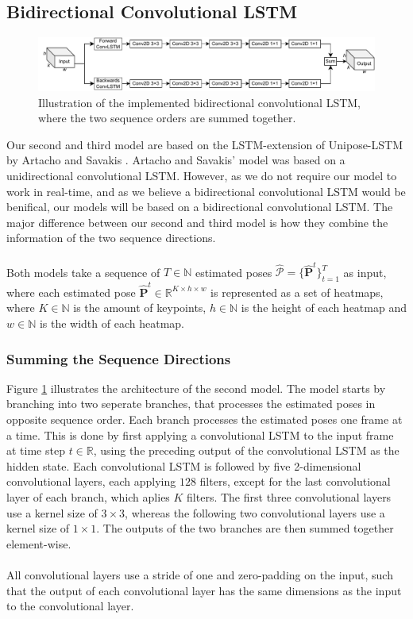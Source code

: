 \documentclass[./main.tex]{subfiles}
\begin{document}
\subsection{Bidirectional Convolutional LSTM}
\begin{figure}[htbp]
    \centering
    \includegraphics[width=\textwidth]{./entities/bi_conv_lstm.pdf}
    \caption{Illustration of the implemented bidirectional convolutional LSTM, where the two sequence orders are summed together.}
    \label{fig:bi_conv_lstm}
\end{figure}

\noindent Our second and third model are based on the LSTM-extension of Unipose-LSTM by Artacho and Savakis \cite{https://doi.org/10.48550/arxiv.2001.08095}. Artacho and Savakis' model was based on a unidirectional convolutional LSTM. However, as we do not require our model to work in real-time, and as we believe a bidirectional convolutional LSTM would be benifical, our models will be based on a bidirectional convolutional LSTM. The major difference between our second and third model is how they combine the information of the two sequence directions.
\\
\\
Both models take a sequence of $T \in \mathbb{N}$ estimated poses $\hat{\mathcal{P}} = \{\hat{\bm{P}}^t\}_{t = 1} ^T$ as input, where each estimated pose $\hat{\bm{P}}^t \in \mathbb{R}^{K \times h \times w}$ is represented as a set of heatmaps, where $K \in \mathbb{N}$ is the amount of keypoints, $h \in \mathbb{N}$ is the height of each heatmap and $w \in \mathbb{N}$ is the width of each heatmap. 

\subsubsection{Summing the Sequence Directions}
Figure \ref{fig:bi_conv_lstm} illustrates the architecture of the second model. The model starts by branching into two seperate branches, that processes the estimated poses in opposite sequence order. Each branch processes the estimated poses one frame at a time. This is done by first applying a convolutional LSTM to the input frame at time step $t \in \mathbb{R}$, using the preceding output of the convolutional LSTM as the hidden state. Each convolutional LSTM is followed by five 2-dimensional convolutional layers, each applying $128$ filters, except for the last convolutional layer of each branch, which aplies $K$ filters. The first three convolutional layers use a kernel size of $3 \times 3$, whereas the following two convolutional layers use a kernel size of $1 \times 1$. The outputs of the two branches are then summed together element-wise.
\\
\\
All convolutional layers use a stride of one and zero-padding on the input, such that the output of each convolutional layer has the same dimensions as the input to the convolutional layer.
\end{document}
